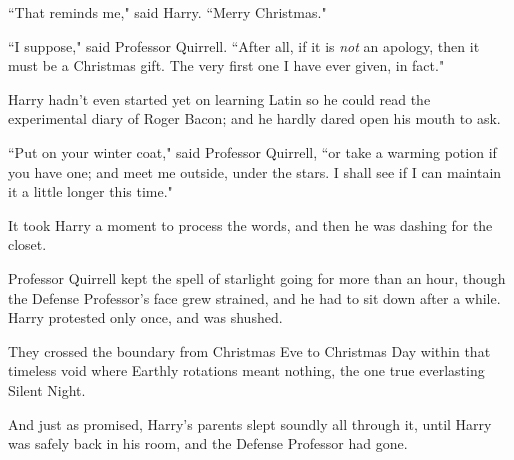 ``That reminds me," said Harry. ``Merry Christmas."

``I suppose," said Professor Quirrell. ``After all, if it is \emph{not} an apology, then it must be a Christmas gift. The very first one I have ever given, in fact."

Harry hadn't even started yet on learning Latin so he could read the experimental diary of Roger Bacon; and he hardly dared open his mouth to ask.

``Put on your winter coat," said Professor Quirrell, ``or take a warming potion if you have one; and meet me outside, under the stars. I shall see if I can maintain it a little longer this time."

It took Harry a moment to process the words, and then he was dashing for the closet.

Professor Quirrell kept the spell of starlight going for more than an hour, though the Defense Professor's face grew strained, and he had to sit down after a while. Harry protested only once, and was shushed.

They crossed the boundary from Christmas Eve to Christmas Day within that timeless void where Earthly rotations meant nothing, the one true everlasting Silent Night.

And just as promised, Harry's parents slept soundly all through it, until Harry was safely back in his room, and the Defense Professor had gone.
